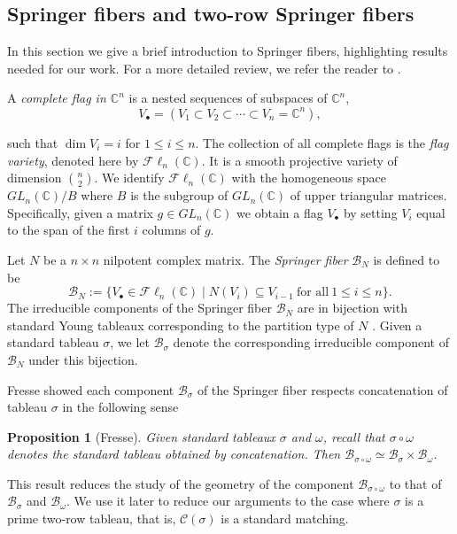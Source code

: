 \documentclass[11pt]{amsart}
\newtheorem{prop}[theorem]{Proposition}
\theoremstyle{remark}
\theoremstyle{remark}
\theoremstyle{definition}
\theoremstyle{definition}
\theoremstyle{definition}
\numberwithin{equation}{section}
\newcommand{\C}{\mathbb{C}}           %
\newcommand{\gs}{\sigma}
\newcommand{\cb}{\mathcal{B}}
\newcommand{\cc}{\mathcal{C}}
\newcommand{\SF}{\mathcal{B}}
\newcommand{\cupsigma}{\cc(\gs)}
\newcommand{\Fl}{\mathcal{F}\ell}
\begin{document}

\subsection{Springer fibers and two-row Springer fibers} \label{Springer} 
In this section we give a brief introduction to Springer fibers, highlighting results needed for our work. For a more detailed review, we refer the reader to \cite{TymoczkoSF,Jantzen2004}.

A \emph{complete flag in $\C^n$} is a nested sequences of subspaces of $\C^n$, 
\[
V_\bullet = (V_1\subset V_2\subset \cdots \subset V_n=\mathbb{C}^n),
\]

such that $\dim V_i=i$ for $1\leq i \leq n$. The collection of all complete flags is the \emph{flag variety}, denoted here by $\Fl_n(\C)$. It is a smooth projective variety of dimension ${n\choose 2}$. We identify $\mathcal{F}\ell_n(\C)$ with the homogeneous space $GL_n(\C)/B$ where $B$ is the subgroup of $GL_n(\C)$ of upper triangular matrices. Specifically, given a matrix $g\in GL_n(\C)$ we obtain a flag $V_\bullet$ by setting $V_i$ equal to the span of the first $i$ columns of $g$. 


Let $N$ be a  $n\times n$ nilpotent complex matrix. The \emph{Springer fiber} $\cb_N$ is defined to be
\[
\cb_N:=\{V_\bullet\in \Fl_n(\C)\mid N\left(V_i\right)\subseteq V_{i-1}~\text{for all}~ 1\leq i\leq n\}.
\]
The irreducible components of the Springer fiber $\mathcal{B}_N$ are in bijection with standard Young tableaux corresponding to the partition type of $N$ \cite{Spaltenstein1976,Vargas79}. Given a standard tableau $\gs$, we let $\SF_\gs$ denote the corresponding irreducible component of $\SF_N$ under this bijection.

Fresse showed each component $\SF_\gs$ of the Springer fiber respects concatenation of tableau $\gs$ in the following sense~\cite[Proposition 7.1]{Fresse2011}

\begin{prop}[Fresse] \label{prop.Fresse} Given standard tableaux $\sigma$ and $\omega$, recall that $\sigma\circ \omega$ denotes the standard tableau obtained by concatenation. Then $\SF_{\sigma\circ \omega} \simeq \SF_\sigma \times \SF_\omega$. 
\end{prop}

This result reduces the study of the geometry of the component $\SF_{\sigma \circ \omega}$ to that of $\SF_\sigma$ and $\SF_\omega$. We use it later to reduce our arguments to the case where $\gs$ is a prime two-row tableau, that is, $\cupsigma$ is a standard matching.
\end{document}
